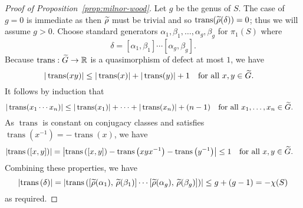 \documentclass[tikz, sepfignums, defaultenums]{nmd/article}
\DeclareMathOperator{\trans}{trans}
\newcommand{\abstrans}[1]{\abs{\trans\left(#1\right)}}
\begin{document}
\begin{proof}[Proof of Proposition~\ref{prop:milnor-wood}]
Let $g$ be the genus of $S$. The case of $g = 0$ is immediate as then
$\rhotil$ must be trivial and so $\trans(\rhotil(\delta)) = 0$; thus
we will assume $g > 0$.  Choose standard generators 
$\alpha_1, \beta_1, \ldots, \alpha_g, \beta_g$ for $\pi_1(S)$
where 
\[
\delta = [\alpha_1, \beta_1]\cdots[\alpha_g, \beta_g].
\]
Because $\trans:\Gtil\to\R$ is a quasimorphism of defect at most
$1$, we have 
\[
|\trans(xy)| \le |\trans(x)| + |\trans(y)| + 1 \mtext{for all $x, y\in\Gtil$.}
\]
It follows by induction that
\[
|\trans(x_1\cdots x_n)| \le |\trans(x_1)| + \cdots +|\trans(x_n)| +
(n-1) \mtext{for all $x_1,\ldots, x_n\in\Gtil$.} 
\]
As $\trans$ is constant on
conjugacy classes and satisfies $\trans(x^{-1}) = -\trans(x)$, we 
have
\[
\abstrans{[x,y]} = \left|\trans\left([x,y]\right) 
    - \trans\left(xyx^{-1}\right) - \trans\left(y^{-1}\right)\right|
   \le 1 \mtext{for all $x, y \in \Gtil$.}
\]
Combining these properties, we have
\[
\abstrans{\delta} = \abstrans{[\rhotil(\alpha_1), \, 
\rhotil(\beta_1)]\cdots[\rhotil(\alpha_g), \, \rhotil(\beta_g)]} \le g + (g - 1) = -\chi(S)
\]
as required.
\end{proof}
\end{document}

